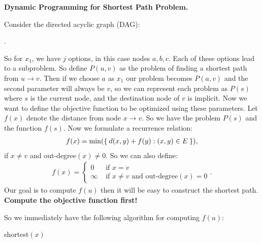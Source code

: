 \documentclass[reqno]{amsbook}
\makeatletter
\theoremstyle{plain}
\numberwithin{section}{chapter}
\numberwithin{equation}{chapter}
\theoremstyle{definition}
\theoremstyle{remark}
\newcommand{\bee}{\begin{equation}\begin{aligned}}
\newcommand{\eee}{\end{aligned}\end{equation}}
\newenvironment{restoretext}%
    {\@parboxrestore%
     \begin{adjustwidth}{}{\leftmargin}%
    }{\end{adjustwidth}
     }
\makeatother
\begin{document}
\textbf{Dynamic Programming for Shortest Path Problem.}

Consider the directed acyclic graph (DAG): 
\begin{center}
.
\end{center}
So for $x_1$, we have $j$ options, in this case nodes $a,b,c$. Each of these options lead to a subproblem. So define $P(u,v)$ as the problem of finding a shortest path from $u \to v$. Then if we choose $a$ as $x_1$ our problem becomes $P(a,v)$ and the second parameter will always be $v$, so we can represent each problem as $P(s)$ where $s$ is the current node, and the destination node of $v$ is implicit. Now we want to define the objective function to be optimized using these parameters. Let $f(x)$ denote the distance from node $x \to v$. So we have the problem $P(s)$ and the function $f(s)$. Now we formulate a recurrence relation: 
\bee 
f(x) = \min(\Set{d(x,y) + f(y):(x,y) \in E}),
 \eee 
 if $x \neq v$ and out-degree$(x) \neq 0$. So we can also define: 
 \bee 
 f(x) = \begin{cases}
 0 & \text{ if } x = v\\
 \infty & \text{ if } x \neq v \text{ and out-degree}(x) = 0
 \end{cases}. 
 \eee 
 Our goal is to compute $f(u)$ then it will be easy to construct the shortest path. \textbf{Compute the objective function first!}
 
 So we immediately have the following algorithm for computing $f(u)$:
 
 \begin{restoretext}
\begin{algorithm}[H]\label{alg1}
\caption{shortest$(x)$}
\end{algorithm}
\end{restoretext}
\end{document}
